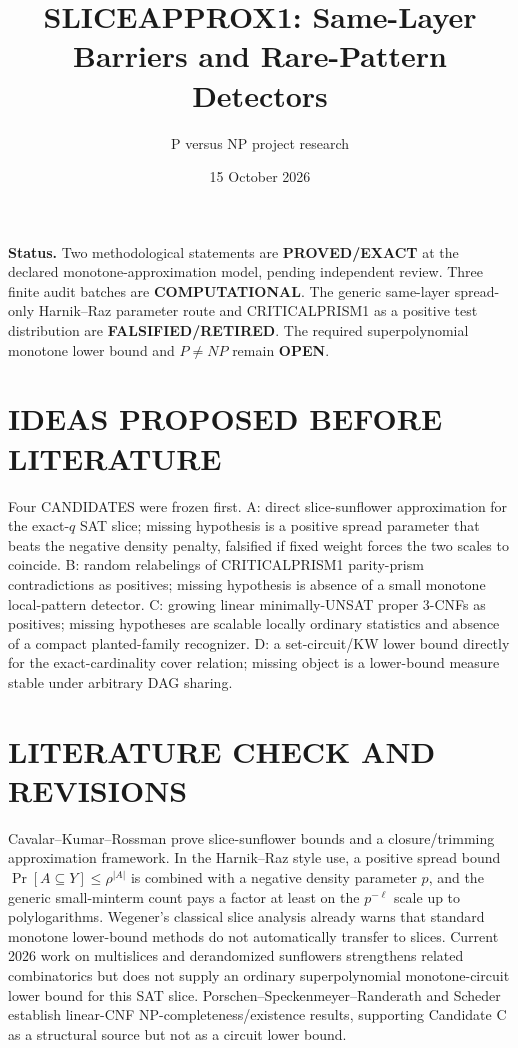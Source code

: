 \documentclass[11pt]{article}
\title{SLICEAPPROX1: Same-Layer Barriers and Rare-Pattern Detectors}
\author{P versus NP project research}
\date{15 October 2026}
\begin{document}
\maketitle
\noindent\textbf{Status.} Two methodological statements are \textbf{PROVED/EXACT} at the declared monotone-approximation model, pending independent review. Three finite audit batches are \textbf{COMPUTATIONAL}. The generic same-layer spread-only Harnik--Raz parameter route and CRITICALPRISM1 as a positive test distribution are \textbf{FALSIFIED/RETIRED}. The required superpolynomial monotone lower bound and $P\ne NP$ remain \textbf{OPEN}.

\section{IDEAS PROPOSED BEFORE LITERATURE}
Four CANDIDATES were frozen first. A: direct slice-sunflower approximation for the exact-$q$ SAT slice; missing hypothesis is a positive spread parameter that beats the negative density penalty, falsified if fixed weight forces the two scales to coincide. B: random relabelings of CRITICALPRISM1 parity-prism contradictions as positives; missing hypothesis is absence of a small monotone local-pattern detector. C: growing linear minimally-UNSAT proper 3-CNFs as positives; missing hypotheses are scalable locally ordinary statistics and absence of a compact planted-family recognizer. D: a set-circuit/KW lower bound directly for the exact-cardinality cover relation; missing object is a lower-bound measure stable under arbitrary DAG sharing.

\section{LITERATURE CHECK AND REVISIONS}
Cavalar--Kumar--Rossman prove slice-sunflower bounds and a closure/trimming approximation framework. In the Harnik--Raz style use, a positive spread bound $\Pr[A\subseteq Y]\le\rho^{|A|}$ is combined with a negative density parameter $p$, and the generic small-minterm count pays a factor at least on the $p^{-\ell}$ scale up to polylogarithms. Wegener's classical slice analysis already warns that standard monotone lower-bound methods do not automatically transfer to slices. Current 2026 work on multislices and derandomized sunflowers strengthens related combinatorics but does not supply an ordinary superpolynomial monotone-circuit lower bound for this SAT slice. Porschen--Speckenmeyer--Randerath and Scheder establish linear-CNF NP-completeness/existence results, supporting Candidate C as a structural source but not as a circuit lower bound.
\end{document}
